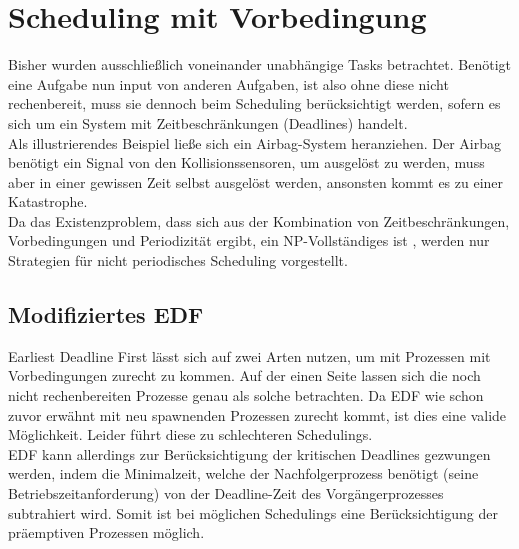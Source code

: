 \section{Scheduling mit Vorbedingung}
Bisher wurden ausschließlich voneinander unabhängige Tasks betrachtet. Benötigt eine Aufgabe nun input von 
anderen Aufgaben, ist also ohne diese nicht rechenbereit, muss sie dennoch beim Scheduling berücksichtigt 
werden, sofern es sich um ein System mit Zeitbeschränkungen (Deadlines) handelt. \\
Als illustrierendes Beispiel ließe sich ein Airbag-System heranziehen. Der Airbag benötigt ein Signal von 
den Kollisionssensoren, um ausgelöst zu werden, muss aber in einer gewissen Zeit selbst ausgelöst werden, 
ansonsten kommt es zu einer Katastrophe. \\
Da das Existenzproblem, dass sich aus der Kombination von Zeitbeschränkungen, Vorbedingungen und 
Periodizität ergibt, ein NP-Vollständiges ist \cite{ESDes}, werden nur Strategien für nicht periodisches 
Scheduling vorgestellt.

\subsection{Modifiziertes EDF}
Earliest Deadline First lässt sich auf zwei Arten nutzen, um mit Prozessen mit Vorbedingungen zurecht zu 
kommen. Auf der einen Seite lassen sich die noch nicht rechenbereiten Prozesse genau als solche betrachten. 
Da EDF wie schon zuvor erwähnt mit neu spawnenden Prozessen zurecht kommt, ist dies eine valide 
Möglichkeit. Leider führt diese zu schlechteren Schedulings. \\
EDF kann allerdings zur Berücksichtigung der kritischen Deadlines gezwungen werden, indem die Minimalzeit, 
welche der Nachfolgerprozess benötigt (seine Betriebszeitanforderung) von der Deadline-Zeit des 
Vorgängerprozesses subtrahiert wird. Somit ist bei möglichen Schedulings eine Berücksichtigung der 
präemptiven Prozessen möglich. \\

